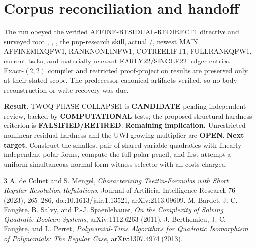 \documentclass[11pt]{article}
\newcommand{\COMP}{\textbf{COMPUTATIONAL}}
\newcommand{\CAND}{\textbf{CANDIDATE}}
\newcommand{\OPEN}{\textbf{OPEN}}
\newcommand{\RET}{\textbf{FALSIFIED/RETIRED}}
\begin{document}
\section{Corpus reconciliation and handoff}
The run obeyed the verified AFFINE-RESIDUAL-REDIRECT1 directive and surveyed
root , , , the pnp-research
skill, actual /, newest MAIN AFFINEMIXQFW1,
RANKNONLINFW1, COTREELIFT1, FULLRANKQFW1, current tasks, and materially
relevant EARLY22/SINGLE22 ledger entries.  Exact-$(2,2)$ compiler and
restricted proof-projection results are preserved only at their stated scope.
The predecessor canonical artifacts verified, so no body reconstruction or
write recovery was due.

\textbf{Result.}  \textsf{TWOQ-PHASE-COLLAPSE1} is \CAND{} pending independent
review, backed by \COMP{} tests; the proposed structural hardness criterion
is \RET{}.  \textbf{Remaining implication.}  Unrestricted nonlinear residual
hardness and the UWI growing multiplier are \OPEN{}.  \textbf{Next target.}
Construct the smallest pair of shared-variable quadratics with linearly
independent polar forms, compute the full polar pencil, and first attempt a
uniform simultaneous-normal-form witness selector with all costs charged.

\begin{thebibliography}{3}
A. de Colnet and S. Mengel,
\emph{Characterizing Tseitin-Formulas with Short Regular Resolution Refutations},
Journal of Artificial Intelligence Research 76 (2023), 265--286,
doi:10.1613/jair.1.13521, arXiv:2103.09609.
M. Bardet, J.-C. Faug\`ere, B. Salvy, and P.-J. Spaenlehauer,
\emph{On the Complexity of Solving Quadratic Boolean Systems},
arXiv:1112.6263 (2011).
J. Berthomieu, J.-C. Faug\`ere, and L. Perret,
\emph{Polynomial-Time Algorithms for Quadratic Isomorphism of Polynomials: The Regular Case},
arXiv:1307.4974 (2013).
\end{thebibliography}
\end{document}
